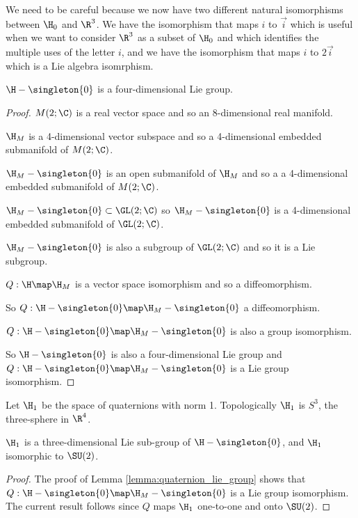 \documentclass[oneside,12pt]{amsart}
\begin{document}
\begin{remark}
We need to be careful because we now have two different natural isomorphisms between $\H_0$ and $\R^{3}$.
We have the isomorphism that maps $i$ to $\vec{i}$ which is useful when we want to consider $\R^3$ as a subset of
$\H_0$ and which identifies the multiple
uses of the letter $i$, and we have the isomorphism that maps $i$ to $2\vec{i}$ which is a Lie algebra isomrphism.
\end{remark}

\begin{lemma}
\label{lemma:quaternion_lie_group}
$\H -\singleton{0}$ is a four-dimensional Lie group.
\end{lemma}
\begin{proof}
$M(2; \C)$ is a real vector space and so an 8-dimensional real manifold. 

$\H_M$ is a 4-dimensional vector subspace and so a 4-dimensional embedded submanifold of $M(2; \C)$.

$\H_M- \singleton{0}$ is an open submanifold of $\H_M$ and so a a 4-dimensional embedded submanifold of $M(2; \C)$.


$\H_M- \singleton{0}\subset \GL(2;\C)$ so $\H_M- \singleton{0}$ is a 4-dimensional embedded submanifold of $\GL(2;\C)$.


$\H_M- \singleton{0}$ is also a subgroup of $\GL(2;\C)$ and so it is a Lie subgroup.

$Q:\H\map\H_M$ is a vector space isomorphism and so a diffeomorphism.

So $Q:\H - \singleton{0}\map\H_M- \singleton{0}$ a diffeomorphism.

$Q:\H- \singleton{0}\map\H_M- \singleton{0}$ is also a group isomorphism.

So $\H - \singleton{0}$ is also a four-dimensional Lie group and $Q:\H-\singleton{0}\map\H_M-\singleton{0}$
 is a Lie group isomorphism.
\end{proof}


\begin{definition}
Let $\H_1$ be the space of quaternions with norm 1. Topologically $\H_1$ is $S^3$, the three-sphere in $\R^4$.
\end{definition}

\begin{corollary}
$\H_1$ is a three-dimensional Lie sub-group of $\H-\singleton{0}$, and $\H_1$ isomorphic to $\SU(2)$.
\end{corollary}
\begin{proof}
The proof of Lemma \ref{lemma:quaternion_lie_group} shows that $Q:\H-\singleton{0}\map\H_M-\singleton{0}$
is a Lie group isomorphism. The current result follows since
$Q$ maps $\H_1$ one-to-one and onto $\SU(2)$.
\end{proof}
\end{document}

